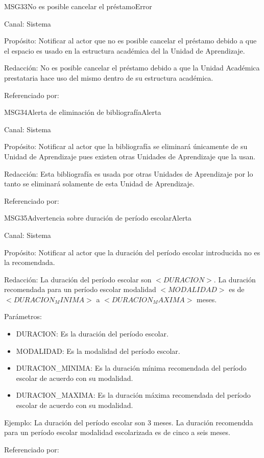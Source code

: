 \begin{mensaje}{MSG33}{No es posible cancelar el préstamo}{Error}
	\item[Canal:] Sistema
	\item[Propósito:] Notificar al actor que no es posible cancelar el préstamo debido a que el espacio es usado en la estructura académica del la Unidad de Aprendizaje.
	\item[Redacción:] No es posible cancelar el préstamo debido a que la Unidad Académica prestataria hace uso del mismo dentro de su estructura académica.
	\item[Referenciado por: ] 
\end{mensaje}

\begin{mensaje}{MSG34}{Alerta de eliminación de bibliografía}{Alerta}
	\item[Canal:] Sistema
	\item[Propósito:] Notificar al actor que la bibliografía se eliminará únicamente de su Unidad de Aprendizaje pues existen otras Unidades de Aprendizaje que la usan.
	\item[Redacción:] Esta bibliografía es usada por otras Unidades de Aprendizaje por lo tanto se eliminará solamente de esta Unidad de Aprendizaje.
	\item[Referenciado por: ] 
\end{mensaje}

\begin{mensaje}{MSG35}{Advertencia sobre duración de período escolar}{Alerta}
	\item[Canal:] Sistema
	\item[Propósito:] Notificar al actor que la duración del período escolar introducida no es la recomendada.
	\item[Redacción:] La duración del período escolar  son $<DURACION>$. La duración recomendada para un período escolar modalidad $<MODALIDAD>$ es de $<DURACION_MINIMA>$ a $<DURACION_MAXIMA>$ meses.
	\item[Parámetros:] 
	\begin{itemize}
		\item DURACION: Es la duración del período escolar.
		\item MODALIDAD: Es la modalidad del período escolar.
		\item DURACION\_MINIMA: Es la duración mínima recomendada del período escolar de acuerdo con su modalidad.
		\item DURACION\_MAXIMA: Es la duración máxima recomendada del período escolar de acuerdo con su modalidad.
	\end{itemize}
	\item[Ejemplo:] La duración del período escolar son 3 meses. La duración recomendda para un período escolar modalidad escolarizada es de cinco a seis meses.
	\item[Referenciado por:] 
\end{mensaje}

